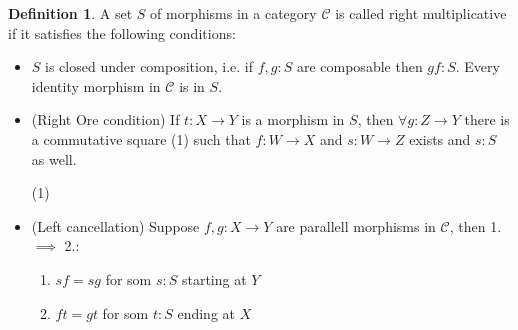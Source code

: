 \documentclass[11pt]{article}
\theoremstyle{definition}
\newtheorem{definition}{Definition}[section]
\theoremstyle{remark}
\begin{document}
            \begin{definition}
                A set $S$ of morphisms in a category $\mathcal{C}$ is called right multiplicative if it satisfies the following conditions:
                \begin{itemize}
                    \item $S$ is closed under composition, i.e. if $f,g : S$ are composable then $gf : S$. Every identity morphism in $\mathcal{C}$ is in $S$.
                    \item (Right Ore condition) If $t : X \rightarrow Y$ is a morphism in $S$, then $\forall g:Z\rightarrow Y$ there is a commutative square (1) such that $f:W\rightarrow X$ and $s:W\rightarrow Z$ exists and $s:S$ as well.
                    \begin{center}
                        (1)
                    \end{center}
                    \item (Left cancellation) Suppose $f,g:X\rightarrow Y$ are parallell morphisms in $\mathcal{C}$, then 1. $\implies$ 2.:
                    \begin{enumerate}
                        \item $sf = sg$ for som $s:S$ starting at $Y$
                        \item $ft = gt$ for som $t:S$ ending at $X$
                    \end{enumerate}
                \end{itemize}
            \end{definition}
\end{document}
